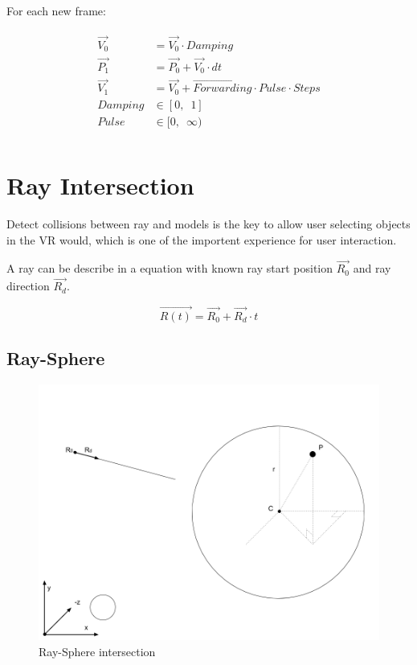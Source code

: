 For each new frame:

\[
\begin{array}{lr}
\begin{aligned}
\overrightarrow{V_0} &= \overrightarrow{V_0} \cdot Damping\\
\overrightarrow{P_1} &= \overrightarrow{P_0} + \overrightarrow{V_0} \cdot dt\\
\overrightarrow{V_1} &= \overrightarrow{V_0} + \overrightarrow{Forwarding} \cdot Pulse \cdot Steps\\
Damping &\in [0,\enspace1]\\
Pulse &\in [0,\enspace \infty)\\
\end{aligned}
\end{array}
\]

\section{Ray Intersection}

Detect collisions between ray and models is the key to allow user selecting objects in the VR would, which is one of the importent experience for user interaction.

A ray can be describe in a equation with known ray start position \emph{$\overrightarrow{R_0}$} and ray direction \emph{$\overrightarrow{R_d}$}.

\begin{equation}
\label{equ:ray-t}
\overrightarrow{R(t)} = \overrightarrow{R_0} + \overrightarrow{R_d} \cdot t
\end{equation}

\subsection{Ray-Sphere}

\begin{figure}[H]
\caption[ray-sphere-intersection]{Ray-Sphere intersection}
\label{fig:ray-sphere}
\centering
\includegraphics[width=\linewidth]{Figures/ray-sphere-intersection.png}
\decoRule
\end{figure}

